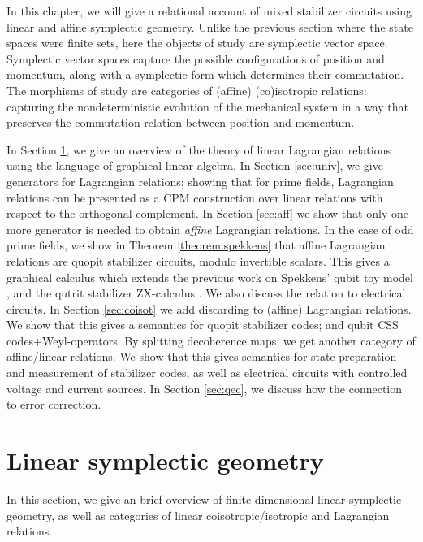 
In this chapter, we will give a relational account of mixed stabilizer circuits using linear and affine symplectic geometry.
Unlike the previous section where the state spaces were finite sets, here the objects of study are symplectic vector space.  Symplectic vector spaces capture the possible configurations of position and momentum, along with a symplectic form which determines their commutation. The morphisms of study  are categories of (affine) (co)isotropic relations: capturing the nondeterministic evolution of the mechanical system in a way that preserves the commutation relation between position and momentum.

In Section \ref{sec:sym}, we give an overview of the theory of linear Lagrangian relations using the language of graphical linear algebra. In Section \ref{sec:univ}, we give generators for Lagrangian relations; showing that for prime fields, Lagrangian relations can be presented as a CPM construction over linear relations with respect to the orthogonal complement.
In Section \ref{sec:aff} we show that only one more generator is needed to obtain {\em affine} Lagrangian relations.  In the case of odd prime fields, we show in Theorem \ref{theorem:spekkens} that affine Lagrangian relations are quopit stabilizer circuits, modulo invertible scalars.  This gives  a graphical calculus which extends the previous work on Spekkens'  qubit toy model \cite{backensspek}, and the qutrit stabilizer ZX-calculus \cite{qutrit}.  We also discuss the relation to electrical circuits.
In Section \ref{sec:coisot} we add discarding to (affine) Lagrangian relations.  We show that this gives a semantics for quopit stabilizer codes; and qubit CSS codes+Weyl-operators.  By splitting decoherence maps, we get another category of affine/linear relations.  We show that this gives semantics for state preparation and measurement of stabilizer codes, as well as electrical circuits with controlled voltage and current sources.  In Section \ref{sec:qec}, we discuss how the connection to error correction.
\section{Linear symplectic geometry}
\label{sec:sym}
In this section, we give an brief overview of finite-dimensional linear symplectic geometry, as well as categories of linear coisotropic/isotropic and Lagrangian relations.

